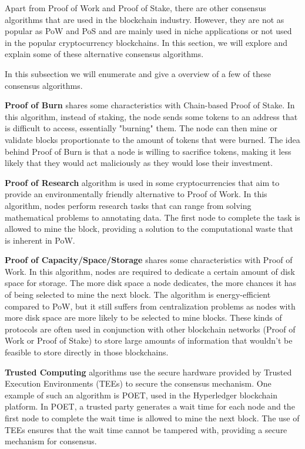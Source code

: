 Apart from Proof of Work and Proof of Stake, there are other consensus algorithms that are used in the blockchain industry. However, they are not as popular as PoW and PoS and are mainly used in niche applications or not used in the popular cryptocurrency blockchains. In this section, we will explore and explain some of these alternative consensus algorithms.

In this subsection we will enumerate and give a overview of a few of these consensus algorithms.

\textbf{Proof of Burn} \cite{karantias2020proof} shares some characteristics with Chain-based Proof of Stake. In this algorithm, instead of staking, the node sends some tokens to an address that is difficult to access, essentially "burning" them. The node can then mine or validate blocks proportionate to the amount of tokens that were burned. The idea behind Proof of Burn is that a node is willing to sacrifice tokens, making it less likely that they would act maliciously as they would lose their investment.

\textbf{Proof of Research} \cite{gridcoin} algorithm is used in some cryptocurrencies that aim to provide an environmentally friendly alternative to Proof of Work. In this algorithm, nodes perform research tasks that can range from solving mathematical problems to annotating data. The first node to complete the task is allowed to mine the block, providing a solution to the computational waste that is inherent in PoW.

\textbf{Proof of Capacity/Space/Storage} \cite{dziembowski2015proofs} shares some characteristics with Proof of Work. In this algorithm, nodes are required to dedicate a certain amount of disk space for storage. The more disk space a node dedicates, the more chances it has of being selected to mine the next block. The algorithm is energy-efficient compared to PoW, but it still suffers from centralization problems as nodes with more disk space are more likely to be selected to mine blocks. These kinds of protocols are often used in conjunction with other blockchain networks (Proof of Work or Proof of Stake) to store large amounts of information that wouldn't be feasible to store directly in those blockchains.

\textbf{Trusted Computing} \cite{bowman2021elapsed} algorithms use the secure hardware provided by Trusted Execution Environments (TEEs) to secure the consensus mechanism. One example of such an algorithm is POET, used in the Hyperledger blockchain platform. In POET, a trusted party generates a wait time for each node and the first node to complete the wait time is allowed to mine the next block. The use of TEEs ensures that the wait time cannot be tampered with, providing a secure mechanism for consensus.

